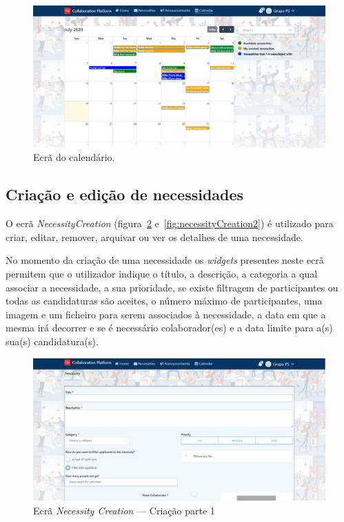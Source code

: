 \begin{figure}[H]
  \centering 
  \includegraphics[scale=0.4]{figures/Calendar.png}
  \caption{Ecrã do calendário.}\label{fig:CalendarScreen}
\end{figure}

\newpage

\subsection{Criação e edição de necessidades}\label{subsec:implementacao:necessityCreation}

O ecrã \textit{NecessityCreation} (figura~\ref{fig:necessityCreation1} e~\ref{fig:necessityCreation2}) é utilizado para criar, editar, remover, arquivar ou ver os detalhes de uma necessidade.
\par
No momento da criação de uma necessidade os \textit{widgets} presentes neste ecrã permitem que o utilizador indique o título, a descrição, a categoria a qual associar a necessidade, a sua prioridade, 
se existe filtragem de participantes ou todas as candidaturas são aceites, o número máximo de participantes, uma imagem e um ficheiro para serem associados à necessidade, a data em que a mesma irá decorrer e se é necessário colaborador(es) e a data limite para a(s) sua(s) candidatura(s).

\begin{figure}[H]
  \centering 
  \includegraphics[scale=0.4]{figures/NecessityCreation1.png}
  \caption{Ecrã \textit{Necessity Creation} --- Criação parte 1}\label{fig:necessityCreation1}
\end{figure}



